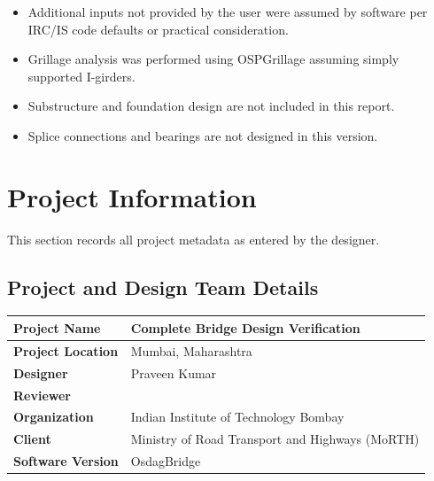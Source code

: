 \documentclass[12pt,a4paper]{report}
\numberwithin{table}{chapter}
\numberwithin{figure}{chapter}
\begin{document}
\begin{itemize}
\item Additional inputs not provided by the user were assumed by software per IRC/IS code defaults or practical consideration.
\item Grillage analysis was performed using OSPGrillage assuming simply supported I-girders.
\item Substructure and foundation design are not included in this report.
\item Splice connections and bearings are not designed in this version.
\end{itemize}

\titleformat{\chapter}[block]{\normalfont\Large\bfseries\centering}{\thechapter}{1em}{}
\titlespacing*{\chapter}{0pt}{-30pt}{10pt}


\chapter{Project Information}

This section records all project metadata as entered by the designer.

\section{Project and Design Team Details}
\label{sec:project-details}

\begin{tabular}{|L{5.5cm}|L{8.5cm}|}
\hline
\textbf{Project Name} & Complete Bridge Design Verification \\
\hline
\textbf{Project Location} & Mumbai, Maharashtra \\
\hline
\textbf{Designer} & Praveen Kumar \\
\hline
\textbf{Reviewer} &  \\
\hline
\textbf{Organization} & Indian Institute of Technology Bombay \\
\hline
\textbf{Client} & Ministry of Road Transport and Highways (MoRTH) \\
\hline
\textbf{Software Version} & OsdagBridge \\
\hline
\end{tabular}
\end{document}
